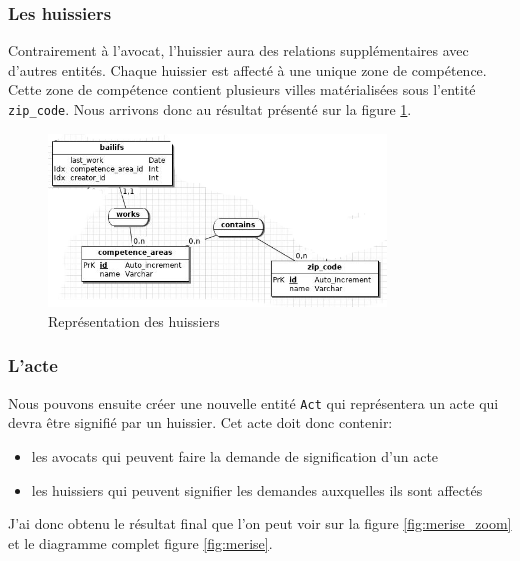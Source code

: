 \documentclass[]{report}
\begin{document}
      \subsubsection{Les huissiers}

        Contrairement à l'avocat, l'huissier aura des relations supplémentaires avec d'autres entités. Chaque huissier est affecté à une unique zone de compétence. Cette zone de compétence contient plusieurs villes matérialisées sous l'entité \verb|zip_code|. Nous arrivons donc au résultat présenté sur la figure \ref{fig:merise_bailiffs}.

        \begin{figure}[h!]
          \centering
          \includegraphics[width=0.8\textwidth]{img/merise_bailiffs.png}
          \caption{Représentation des huissiers}
          \label{fig:merise_bailiffs}
        \end{figure}

      \subsubsection{L'acte}

        Nous pouvons ensuite créer une nouvelle entité \verb|Act| qui représentera un acte qui devra être signifié par un huissier. Cet acte doit donc contenir:

        \begin{itemize}
          \item les avocats qui peuvent faire la demande de signification d'un acte
          \item les huissiers qui peuvent signifier les demandes auxquelles ils sont affectés
        \end{itemize}

      J'ai donc obtenu le résultat final que l'on peut voir sur la figure \ref{fig:merise_zoom} et le diagramme complet figure \ref{fig:merise}.
\end{document}
